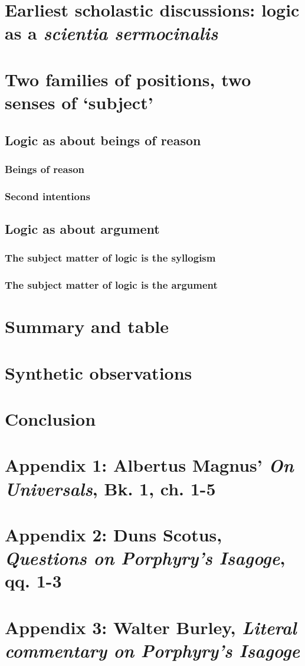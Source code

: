 \documentclass[]{article}
\begin{document}
\section{Earliest scholastic discussions: logic as a \textit{scientia sermocinalis}}
\section{Two families of positions, two senses of `subject'}
\subsection{Logic as about beings of reason}
\subsubsection{Beings of reason}
\subsubsection{Second intentions}
\subsection{Logic as about argument}
\subsubsection{The subject matter of logic is the syllogism}
\subsubsection{The subject matter of logic is the argument}
\section{Summary and table}
\section{Synthetic observations}
\section{Conclusion}
\section{Appendix 1: Albertus Magnus' \textit{On Universals}, Bk. 1, ch. 1-5}
\section{Appendix 2: Duns Scotus, \textit{Questions on Porphyry's Isagoge}, qq. 1-3}
\section{Appendix 3: Walter Burley, \textit{Literal commentary on Porphyry's Isagoge}}
\end{document}
